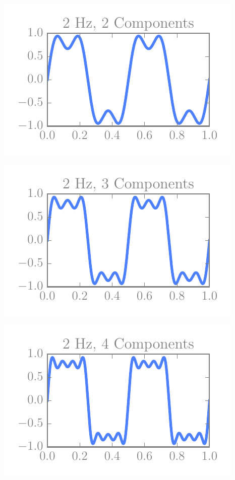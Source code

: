 \begin{multicols}{5}
\includegraphics[width=\linewidth]{../img/fouriers/2_2.pdf}

\includegraphics[width=\linewidth]{../img/fouriers/2_3.pdf}

\includegraphics[width=\linewidth]{../img/fouriers/2_4.pdf}


\end{multicols}
